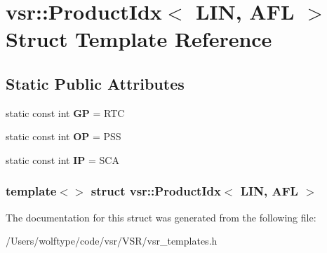 \hypertarget{structvsr_1_1_product_idx_3_01_l_i_n_00_01_a_f_l_01_4}{\section{vsr\-:\-:Product\-Idx$<$ L\-I\-N, A\-F\-L $>$ Struct Template Reference}
\label{structvsr_1_1_product_idx_3_01_l_i_n_00_01_a_f_l_01_4}
}
\subsection*{Static Public Attributes}
\begin{DoxyCompactItemize}
\item 
\hypertarget{structvsr_1_1_product_idx_3_01_l_i_n_00_01_a_f_l_01_4_a42362727639f6570e7f5ab5fe7902afe}{static const int {\bfseries G\-P} = R\-T\-C}\label{structvsr_1_1_product_idx_3_01_l_i_n_00_01_a_f_l_01_4_a42362727639f6570e7f5ab5fe7902afe}

\item 
\hypertarget{structvsr_1_1_product_idx_3_01_l_i_n_00_01_a_f_l_01_4_ad47b46b0ed68064ba82eee4ca988a22b}{static const int {\bfseries O\-P} = P\-S\-S}\label{structvsr_1_1_product_idx_3_01_l_i_n_00_01_a_f_l_01_4_ad47b46b0ed68064ba82eee4ca988a22b}

\item 
\hypertarget{structvsr_1_1_product_idx_3_01_l_i_n_00_01_a_f_l_01_4_a95c5e0579c17aad57aa09d298084d90a}{static const int {\bfseries I\-P} = S\-C\-A}\label{structvsr_1_1_product_idx_3_01_l_i_n_00_01_a_f_l_01_4_a95c5e0579c17aad57aa09d298084d90a}

\end{DoxyCompactItemize}
\subsubsection*{template$<$$>$ struct vsr\-::\-Product\-Idx$<$ L\-I\-N, A\-F\-L $>$}



The documentation for this struct was generated from the following file\-:\begin{DoxyCompactItemize}
\item 
/\-Users/wolftype/code/vsr/\-V\-S\-R/vsr\-\_\-templates.\-h\end{DoxyCompactItemize}
